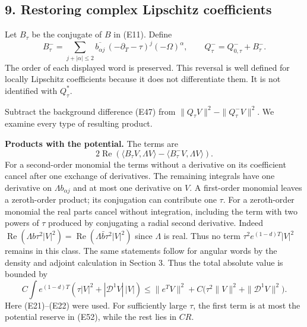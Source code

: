 \documentclass[
  11pt,
]{article}
\makeatletter
\let\ReaderOriginalAnchorStart\hyper@anchorstart
\let\ReaderOriginalAnchorEnd\hyper@anchorend
\let\ReaderPendingAliases\@empty
\def\ReaderArmAliases#1{\gdef\ReaderPendingAliases{#1}}
\def\hyper@anchorstart#1{\ReaderIfNativeAnchorTF{#1}{\ReaderPendingAliases\global\let\ReaderPendingAliases\@empty}{}\ReaderOriginalAnchorStart{#1}}
\makeatother
\begin{document}
\ReaderArmAliases{\ReaderOriginalAnchorStart{AN03-EXU-009}\ReaderOriginalAnchorEnd\begingroup\expandafter\def\csname @currentHref\endcsname{AN03-EXU-009}\label{AN03-EXU-009}\endgroup\ReaderOriginalAnchorStart{an03-exu-009-restoring-complex-lipschitz-coefficients}\ReaderOriginalAnchorEnd\begingroup\expandafter\def\csname @currentHref\endcsname{an03-exu-009-restoring-complex-lipschitz-coefficients}\label{an03-exu-009-restoring-complex-lipschitz-coefficients}\endgroup\ReaderOriginalAnchorStart{9-restoring-complex-lipschitz-coefficients}\ReaderOriginalAnchorEnd\begingroup\expandafter\def\csname @currentHref\endcsname{9-restoring-complex-lipschitz-coefficients}\label{9-restoring-complex-lipschitz-coefficients}\endgroup\ReaderOriginalAnchorStart{restoring-complex-lipschitz-coefficients}\ReaderOriginalAnchorEnd}
\subsection{9. Restoring complex Lipschitz
coefficients}\label{restoring-complex-lipschitz-coefficients}

Let \(B_\tau\) be the conjugate of \(B\) in (E11). Define \[
 B_\tau^-=
 \sum_{j+|\alpha|\leq2}\overline{b_{\alpha j}}\,
                  (-\partial_T-\tau)^j(-\Omega)^\alpha,
 \qquad Q_\tau^-=Q_{0,\tau}^-+B_\tau^-.                         \tag{E53}
\] The order of each displayed word is preserved. This reversal is well
defined for locally Lipschitz coefficients because it does not
differentiate them. It is not identified with \(Q_\tau^*\).

Subtract the background difference (E47) from
\(\|Q_\tau V\|^2-\|Q_\tau^-V\|^2\). We examine every type of resulting
product.

\textbf{Products with the potential.} The terms are \[
 2\operatorname{Re}
   \left(\langle B_\tau V,\Lambda V\rangle
                    -\langle B_\tau^-V,\Lambda V\rangle\right).
\] For a second-order monomial the terms without a derivative on its
coefficient cancel after one exchange of derivatives. The remaining
integrals have one derivative on \(\Lambda b_{\alpha j}\) and at most
one derivative on \(V\). A first-order monomial leaves a zeroth-order
product; its conjugation can contribute one \(\tau\). For a zeroth-order
monomial the real parts cancel without integration, including the term
with two powers of \(\tau\) produced by conjugating a radial second
derivative. Indeed
\(\operatorname{Re}(\Lambda b\tau^2|V|^2)=\operatorname{Re}(\Lambda\bar b\tau^2|V|^2)\)
since \(\Lambda\) is real. Thus no term \(\tau^2e^{(1-d)T}|V|^2\)
remains in this class. The same statements follow for angular words by
the density and adjoint calculation in Section 3. Thus the total
absolute value is bounded by \[
 C\int e^{(1-d)T}
       \left(\tau|V|^2+|\mathcal D^1V|\,|V|\right)
 \leq \|e^TV\|^2
       +C\bigl(\tau^2\|V\|^2+\|\mathcal D^1V\|^2\bigr).          \tag{E54}
\] Here (E21)--(E22) were used. For sufficiently large \(\tau\), the
first term is at most the potential reserve in (E52), while the rest
lies in \(CR\).
\end{document}
